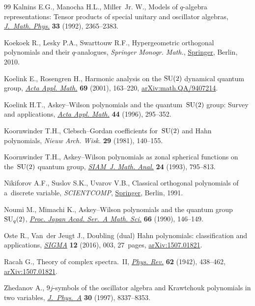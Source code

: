 \documentclass[pdftex]{sigma}
\numberwithin{equation}{section}
\theoremstyle{definition}
\begin{document}
\begin{thebibliography}{99}
Kalnins E.G., Manocha H.L., Miller~Jr. W., Models of {$q$}-algebra
 representations: {T}ensor products of special unitary and oscillator
 algebras, \href{https://doi.org/10.1063/1.529607}{\textit{J.~Math. Phys.}}
 \textbf{33} (1992), 2365--2383.

Koekoek R., Lesky P.A., Swarttouw R.F., Hypergeometric orthogonal polynomials
 and their {$q$}-analogues, \textit{Springer Monogr. Math.},
 \href{https://doi.org/10.1007/978-3-642-05014-5}{Springer}, Berlin, 2010.

Koelink E., Rosengren H., Harmonic analysis on the {${\rm SU}(2)$} dynamical
 quantum group, \href{https://doi.org/10.1023/A:1013071729320}{\textit{Acta
 Appl. Math.}} \textbf{69} (2001), 163--220,
 \href{http://arxiv.org/abs/math.QA/9407214}{arXiv:math.QA/9407214}.

Koelink H.T., Askey--{W}ilson polynomials and the quantum~{${\rm SU}(2)$}
 group: {S}urvey and applications,
 \href{https://doi.org/10.1007/BF00047396}{\textit{Acta Appl. Math.}}
 \textbf{44} (1996), 295--352.

Koornwinder T.H., Clebsch--{G}ordan coefficients for~{${\rm SU}(2)$} and {H}ahn
 polynomials, \textit{Nieuw Arch. Wisk.} \textbf{29} (1981), 140--155.

Koornwinder T.H., Askey--{W}ilson polynomials as zonal spherical functions on
 the~{${\rm SU}(2)$} quantum group,
 \href{https://doi.org/10.1137/0524049}{\textit{SIAM~J. Math. Anal.}}
 \textbf{24} (1993), 795--813.

Nikiforov A.F., Suslov S.K., Uvarov V.B., Classical orthogonal polynomials of a~discrete variable, \textit{SCIENTCOMP},
 \href{https://doi.org/10.1007/978-3-642-74748-9}{Springer}, Berlin, 1991.

Noumi M., Mimachi K., Askey--{W}ilson polynomials and the quantum group~{${\rm
 SU}_q(2)$}, \href{https://doi.org/10.3792/pjaa.66.146}{\textit{Proc. Japan
 Acad. Ser.~A Math. Sci.}} \textbf{66} (1990), 146--149.

Oste R., Van~der Jeugt J., Doubling (dual) {H}ahn polynomials: classification
 and applications,
 \href{https://doi.org/10.3842/SIGMA.2016.003}{\textit{SIGMA}} \textbf{12}
 (2016), 003, 27~pages,
 \href{http://arxiv.org/abs/1507.01821}{arXiv:1507.01821}.

Racah G., Theory of complex spectra.~{II},
 \href{https://doi.org/10.1103/PhysRev.62.438}{\textit{Phys. Rev.}}
 \textbf{62} (1942), 438--462,
 \href{http://arxiv.org/abs/1507.01821}{arXiv:1507.01821}.

Zhedanov A., {$9j$}-symbols of the oscillator algebra and {K}rawtchouk
 polynomials in two variables,
 \href{https://doi.org/10.1088/0305-4470/30/23/029}{\textit{J.~Phys.~A}}
 \textbf{30} (1997), 8337--8353.

\end{thebibliography}\LastPageEnding
\end{document}

